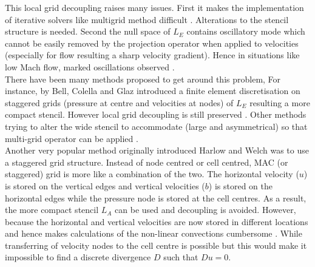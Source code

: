 This local grid decoupling raises many issues. First it makes the implementation of iterative solvers like multigrid method difficult \cite{almgren1996numerical,almgren2000approximate,howell1997adaptive}. Alterations to the stencil structure is needed. Second the null space of $\textit{L}_E$ contains oscillatory mode which cannot be easily removed by the projection operator when applied to velocities \cite{minion1996projection} (especially for flow resulting a sharp velocity gradient). Hence in situations like low Mach flow, marked oscillations observed \cite{lal1993projection}.\\

There have been many methods proposed to get around this problem, For instance, by Bell, Colella and Glaz introduced a finite element discretisation on staggered grids \cite{bell1989second} (pressure at centre and velocities at nodes) of $\textit{L}_E$ resulting a more compact stencil. However local grid decoupling is still preserved \cite{almgren1996numerical,almgren2000approximate}. Other methods trying to alter the wide stencil to accommodate (large and asymmetrical) so that multi-grid operator can be applied \cite{howell1997adaptive}.\\
Another very popular method originally introduced Harlow and Welch \cite{harlow1965numerical} was to use a staggered grid structure. Instead of node centred or cell centred, MAC (or staggered) grid is more like a combination of the two. The horizontal velocity ($\textit{u}$) is stored on the vertical edges and vertical velocities ($\textit{b}$) is stored on the horizontal edges while the pressure node is stored at the cell centres. As a result, the more compact stencil $\textit{L}_A$ can be used and decoupling is avoided. However, because the horizontal and vertical velocities are now stored in different locations and hence makes calculations of the non-linear convections cumbersome \cite{almgren1996numerical,howell1997adaptive}. While transferring of velocity nodes to the cell centre is possible but this would make it impossible to find a discrete divergence $\textit{D}$ such that $\textit{D} \textit{u} = 0$.\\


